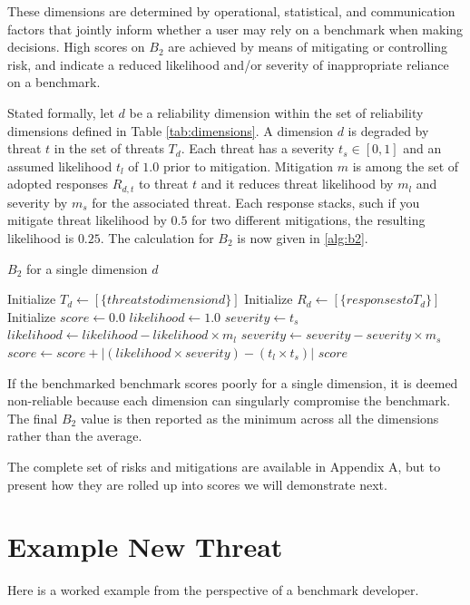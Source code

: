 \documentclass{article}
\newcommand\bb{$B_2$ }
\begin{document}
These dimensions are determined by operational, statistical, and communication factors that jointly inform whether a user may rely on a benchmark when making decisions. High scores on \bb are achieved by means of mitigating or controlling risk, and indicate a reduced likelihood and/or severity of inappropriate reliance on a benchmark.

Stated formally, let $d$ be a reliability dimension within the set of reliability dimensions defined in Table \ref{tab:dimensions}. A dimension $d$ is degraded by threat $t$ in the set of threats $T_d$. Each threat has a severity $t_s\in{[0,1]}$ and an assumed likelihood $t_l$ of $1.0$ prior to mitigation. Mitigation $m$ is among the set of adopted responses $R_{d,t}$ to threat $t$ and it reduces threat likelihood by $m_l$ and severity by $m_s$ for the associated threat. Each response stacks, such if you mitigate threat likelihood by $0.5$ for two different mitigations, the resulting likelihood is $0.25$. The calculation for \bb is now given in \ref{alg:b2}.

\begin{algorithm}
\label{alg:b2}
\caption{\bb for a single dimension $d$}
\begin{algorithmic}[1]
\State Initialize $T_d \gets [ \{ threats to dimension d \} ]$
\State Initialize $R_d \gets [ \{ responses to T_d \} ]$
\State Initialize $score \gets 0.0$
    \State $likelihood \gets 1.0$
    \State $severity \gets t_s$
        \State $likelihood \gets likelihood - likelihood \times m_l$
        \State $severity \gets severity - severity \times m_s$
    \EndFor
    \State $score \gets score + |(likelihood\times severity) - (t_l\times t_s)|$
\EndFor
\State \Return $score$
\end{algorithmic}
\end{algorithm}

If the benchmarked benchmark scores poorly for a single dimension, it is deemed non-reliable because each dimension can singularly compromise the benchmark. The final \bb value is then reported as the minimum across all the dimensions rather than the average.

The complete set of risks and mitigations are available in Appendix A, but to present how they are rolled up into scores we will demonstrate next.
\section{Example New Threat}
Here is a worked example from the perspective of a benchmark developer.
\end{document}
